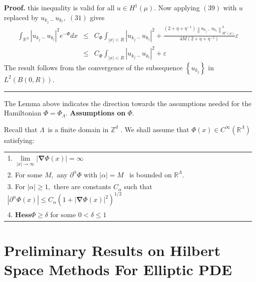 \documentclass{article}
\newenvironment{proof}[1][Proof]{\noindent\textbf{#1.} }{\ \rule{0.5em}{0.5em}}
\begin{document}
\begin{proof}
this inequality is valid for all $u\in H^{1}(\mu ).$ Now applying $\left(
39\right) $ with $u$ replaced by $u_{k_{j}-}u_{k_{l}},$ $\left( 31\right) $
gives%
\begin{eqnarray*}
\int_{\mathbb{R}^{\Lambda }}\left| u_{k_{j}-}u_{k_{l}}\right| ^{2}e^{-\Phi
}dx &\leq &C_{\Phi }\int_{\left| x\right| <R}\left|
u_{k_{j}-}u_{k_{l}}\right| ^{2}+\frac{(2+\eta +\eta ^{-1})\left\|
u_{k_{j}-}u_{k_{l}}\right\| _{H^{1}(\mu )}^{2}}{4M(2+\eta +\eta ^{-1})}%
\varepsilon \\
&\leq &C_{\Phi }\int_{\left| x\right| <R}\left| u_{k_{j}-}u_{k_{l}}\right|
^{2}+\varepsilon
\end{eqnarray*}%
The result follows from the convergence of the subsequence $\left\{
u_{k_{j}}\right\} $ in $L^{2}(B(0,R)).$
\end{proof}

The Lemma above indicates the direction towards the assumptions needed for
the Hamiltonian $\Phi =\Phi _{\Lambda }.$\newline
\textbf{Assumptions on }$\Phi .$

Recall that $\Lambda $\ is a finite domain in $\mathbb{Z}^{d}$ $.$ We shall
assume that $\Phi (x)\in C^{\infty }(\mathbb{R}^{\Lambda })$ satisfying:

\begin{tabular}{l}
1.$\;\lim\limits_{\left| x\right| \rightarrow \infty }\left| \mathbf{\nabla }%
\Phi (x)\right| =\infty $ \\ 
2. For some $M,$ any $\partial ^{\alpha }\Phi $ with $\left| \alpha \right|
=M$ \ is bounded on $\mathbb{R}^{\Lambda }.$ \\ 
3. For $\left| \alpha \right| \geq 1,$ there are constants $C_{\alpha }$
such that $\left| \partial ^{\alpha }\Phi (x)\right| \leq C_{\alpha }\left(
1+\left| \mathbf{\nabla }\Phi (x)\right| ^{2}\right) ^{1/2}$ \\ 
4. $\mathbf{Hess}\Phi \geq \delta $ for some $0<\delta \leq 1$%
\end{tabular}

\section{Preliminary Results on Hilbert Space Methods For Elliptic PDE}
\end{document}
